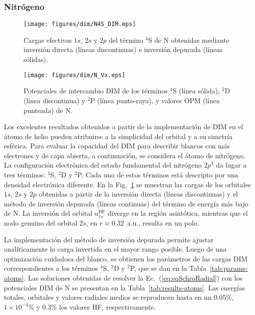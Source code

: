 \subsubsection{Nitrógeno}

\begin{figure}[t]
\centering
\texttt{[image: figures/dim/N4S\_DIM.eps]}
\caption[Cargas efectivas DIM de N.]
{Cargas efectivas $1s$, $2s$ y $2p$ del término $^4$S de N obtenidas 
mediante inversión directa (líneas discontinuas) e inversión depurada 
(líneas sólidas).}
\label{fig:Nzeff}
\end{figure}

\begin{figure}[t]
\centering
\texttt{[image: figures/dim/N\_Vx.eps]}
\caption[Potenciales de intercambio DIM de N.]
{Potenciales de intercambio DIM de los términos $^4$S (línea sólida), 
$^2$D (línea discontinua) y $^2$P (línea punto-raya), y valores OPM 
(línea punteada) de N.}
\label{fig:NVx}
\end{figure}

Los excelentes resultados obtenidos a partir de la implementación de DIM 
en el átomo de helio pueden atribuirse a la simplicidad del orbital y a 
su simetría esférica. Para evaluar la capacidad del DIM para describir 
blancos con más electrones y de capa abierta, a continuación, se 
considera el átomo de nitrógeno. 
La configuración electrónica del estado fundamental del nitrógeno $2p^3$ 
da lugar a tres términos: $^4$S, $^2$D y $^2$P. Cada uno de estos 
términos está descripto por una densidad electrónica diferente. En la 
Fig.~\ref{fig:Nzeff} se muestran las cargas de los orbitales $1s$, $2s$ 
y $2p$ obtenidas a partir de la inversión directa (líneas discontinuas) 
y el método de inversión depurada (líneas continuas) del término de 
energía más bajo de N. La inversión del orbital $u_{1s}^{\mathrm{HF}}$ 
diverge en la región asintótica, mientras que el nodo genuino del 
orbital $2s$, en $r\approx 0.32$~a.u., resulta en un polo. 

La implementación del método de inversión depurada permite ajustar 
analíticamente la carga invertida en el mayor rango posible. Luego de 
una optimización cuidadosa del blanco, se obtienen los parámetros de las 
cargas DIM correspondientes a los términos $^4$S, $^2$D y $^2$P, que se 
dan en la Tabla~\ref{tab:params-atoms}. Las soluciones obtenidas de 
resolver la Ec.~(\ref{eq:eqSchroRadial}) con los potenciales DIM de N 
se presentan en la Tabla~\ref{tab:results-atoms}. Las energías totales, 
orbitales y valores radiales medios se reproducen hasta en un $0.05\%$, 
$1\times 10^{-4}\%$ y $0.3\%$ los valores HF, respectivamente. 

